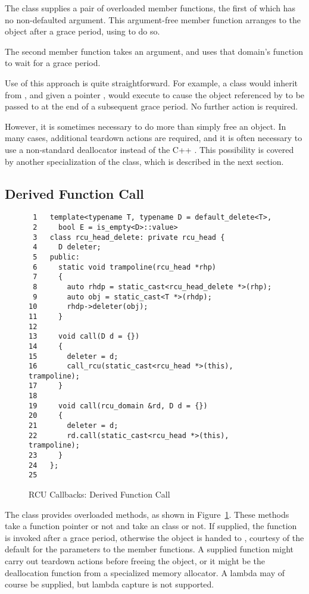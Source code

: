 \documentclass[letterpaper,twocolumn,10pt]{article}
\begin{document}
The  class supplies a pair of overloaded 
member functions, the first of which has no non-defaulted argument.
This argument-free member function arranges to  the
object after a grace period, using  to do so.

The second  member function takes an 
argument, and uses that domain's  function to wait
for a grace period.

Use of this approach is quite straightforward.
For example, a class  would inherit from
, and given a  pointer ,
would execute  to cause the object referenced
by  to be passed to  at the end of a subsequent
grace period.
No further action is required.

However, it is sometimes necessary to do more than simply free an
object.
In many cases, additional teardown actions are required, and
it is often necessary to use a non-standard deallocator instead
of the C++ .
This possibility is covered by another specialization of the
 class, which is described in the next section.

\subsection{Derived Function Call}
\label{sec:Derived Function Call}

\begin{figure}[tbp]
{ \scriptsize
\begin{verbatim}
 1   template<typename T, typename D = default_delete<T>,
 2     bool E = is_empty<D>::value>
 3   class rcu_head_delete: private rcu_head {
 4     D deleter;
 5   public:
 6     static void trampoline(rcu_head *rhp)
 7     {
 8       auto rhdp = static_cast<rcu_head_delete *>(rhp);
 9       auto obj = static_cast<T *>(rhdp);
10       rhdp->deleter(obj);
11     }
12
13     void call(D d = {})
14     {
15       deleter = d;
16       call_rcu(static_cast<rcu_head *>(this), trampoline);
17     }
18
19     void call(rcu_domain &rd, D d = {})
20     {
21       deleter = d;
22       rd.call(static_cast<rcu_head *>(this), trampoline);
23     }
24   };
25
\end{verbatim}
}
\caption{RCU Callbacks: Derived Function Call}
\label{fig:RCU Callbacks: Derived Function Call}
\end{figure}

The  class provides overloaded  methods,
as shown in
Figure~\ref{fig:RCU Callbacks: Derived Function Call}.
These methods take a function pointer or not and take an
 class or not.
If supplied, the function is invoked after a grace period,
otherwise the object is handed to , courtesy of the default
for the  parameters to the  member functions.
A supplied function might carry out teardown actions before freeing
the object, or it might be the deallocation function from a
specialized memory allocator.
A lambda may of course be supplied, but lambda capture is not supported.
\end{document}
